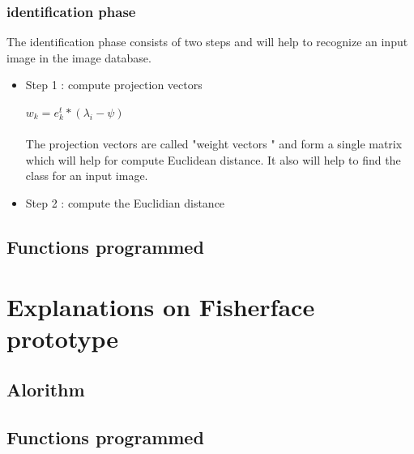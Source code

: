 \subsubsection{identification phase}  
The identification phase consists of two steps and   will help to  recognize an input image in the image database.
 \begin{itemize}
 \item Step 1 : compute projection vectors
 
\begin{math}
   w_{k} = e^t_{k} * (\lambda_{i} -\psi)
\end{math} 
 
 
 

\paragraph{}
The projection vectors are called "weight vectors " and form a single matrix which will help for  compute  Euclidean distance. It also will help to find the class for an  input image.
\item Step 2 : compute the Euclidian distance
 
 \end {itemize}




 




\subsection{Functions programmed}
\section{Explanations on Fisherface prototype}
\subsection{Alorithm}
\subsection{Functions programmed}